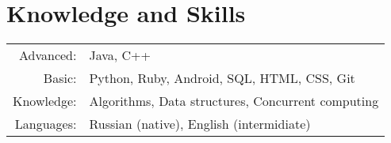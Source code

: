 \documentclass[a4paper,12pt]{article}
\begin{document}
\section{Knowledge and Skills}
\begin{tabular}{rl}
Advanced:& Java, C++\\
Basic:& Python, Ruby, Android, SQL, HTML, CSS, Git\\
Knowledge:& Algorithms, Data structures, Concurrent computing\\
Languages:& Russian (native), English (intermidiate)
\end{tabular}


\end{document}

